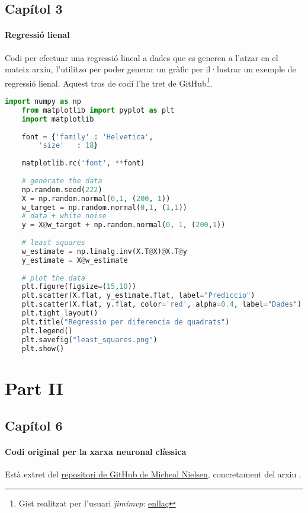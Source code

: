 \subsection{Capítol 3}

\paragraph{Regressió lienal}
\label{lst:linear_regression}
Codi per efectuar una regressió lineal a dades que es generen a l'atzar en el mateix arxiu, l'utilitzo per poder generar un gràfic per il·lustrar un exemple de regressió lienal. Aquest tros de codi l'he tret de GitHub\footnote{Gist realitzat per l'usuari \textit{jimimvp}: \href{https://gist.github.com/jimimvp/05ece11fec25d5c8c009af9ba469d6c2}{enllaç}}.

\begin{lstlisting}[language=Python, caption=Regressió lineal]
	import numpy as np
	from matplotlib import pyplot as plt
	import matplotlib
	
	font = {'family' : 'Helvetica',
		'size'   : 18}
	
	matplotlib.rc('font', **font)
	
	# generate the data
	np.random.seed(222)
	X = np.random.normal(0,1, (200, 1))
	w_target = np.random.normal(0,1, (1,1))
	# data + white noise
	y = X@w_target + np.random.normal(0, 1, (200,1))
	
	# least squares
	w_estimate = np.linalg.inv(X.T@X)@X.T@y
	y_estimate = X@w_estimate
	
	# plot the data
	plt.figure(figsize=(15,10))
	plt.scatter(X.flat, y_estimate.flat, label="Prediccio")
	plt.scatter(X.flat, y.flat, color='red', alpha=0.4, label="Dades")
	plt.tight_layout()
	plt.title("Regressio per diferencia de quadrats")
	plt.legend()
	plt.savefig("least_squares.png")
	plt.show()
\end{lstlisting}

\section{Part II}
\subsection{Capítol 6}

\paragraph{Codi original per la xarxa neuronal clàssica}
\label{lst:disc_original}
Està extret del \href{https://github.com/mnielsen/neural-networks-and-deep-learning}{repositori de GitHub de Micheal Nielsen}, concretament del arxiu .


